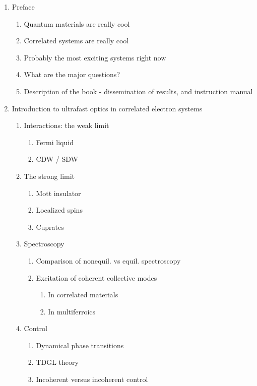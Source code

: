\documentclass{article}
\begin{document}
\begin{enumerate}
\item Preface
    \begin{enumerate}
    \item Quantum materials are really cool
    \item Correlated systems are really cool
    \item Probably the most exciting systems right now
    \item What are the major questions?
    \item Description of the book - dissemination of results, and instruction manual
    \end{enumerate}
\item Introduction to ultrafast optics in correlated electron systems
    \begin{enumerate}
    \item Interactions: the weak limit
        \begin{enumerate}
        \item Fermi liquid
        \item CDW / SDW
        \end{enumerate}
    \item The strong limit
        \begin{enumerate}
        \item Mott insulator
        \item Localized spins
        \item Cuprates
        \end{enumerate}
    \item Spectroscopy
        \begin{enumerate}
        \item Comparison of nonequil. vs equil. spectroscopy
        \item Excitation of coherent collective modes
            \begin{enumerate}
            \item In correlated materials
            \item In multiferroics
            \end{enumerate}
        \end{enumerate}
    \item Control
        \begin{enumerate}
        \item Dynamical phase transitions
        \item TDGL theory
        \item Incoherent versus incoherent control

\end{enumerate}
\end{enumerate}
\end{enumerate}
\end{document}
